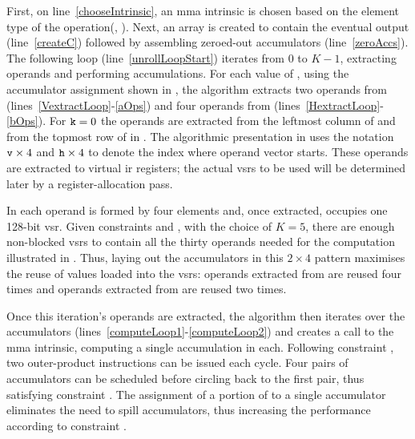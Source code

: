 \documentclass[\main/thesis.tex]{subfiles}
\begin{document}
First, on line~\ref{chooseIntrinsic}, an \gls{mma} intrinsic is chosen based on the element type of the operation\footnotemark (\eg {}, ).
Next, an array is created to contain the eventual output (line~\ref{createC}) followed by assembling zeroed-out accumulators (line~\ref{zeroAccs}).
The following loop (line~\ref{unrollLoopStart}) iterates from $0$ to $K-1$, extracting operands and performing accumulations.
For each value of , using the accumulator assignment shown in , the algorithm extracts two operands from  (lines~\ref{VextractLoop}-\ref{aOps}) and four operands from  (lines~\ref{HextractLoop}-\ref{bOps}).
For $\text{\code{k}}=0$ the operands are extracted from the leftmost column of  and from the topmost row of  in .
The algorithmic presentation in  uses the notation \code{ATile[}$\text{\code{v}} \times 4$\code{][k]} and \code{BTile[}$\text{\code{h}} \times 4$\code{][k]} to denote the index where operand vector starts.
These operands are extracted to virtual \gls{ir} registers; the actual \glspl{vsr} to be used will be determined later by a register-allocation pass.

In  each operand is formed by four elements and, once extracted, occupies one 128-bit \gls{vsr}.
Given constraints  and , with the choice of $K = 5$, there are enough non-blocked \glspl{vsr} to contain all the thirty operands needed for the computation illustrated in .
Thus, laying out the accumulators in this $2 \times 4$ pattern maximises the reuse of values loaded into the \glspl{vsr}: operands extracted from  are reused four times and operands extracted from  are reused two times.

Once this iteration's operands are extracted, the algorithm then iterates over the accumulators (lines~\ref{computeLoop1}-\ref{computeLoop2}) and creates a call to the \gls{mma} \gls{intrinsic}, computing a single accumulation in each.
Following constraint , two outer-product instructions can be issued each cycle.
Four pairs of accumulators can be scheduled before circling back to the first pair, thus satisfying constraint .
The assignment of a portion of  to a single accumulator eliminates the need to spill accumulators, thus increasing the performance according to constraint .
\end{document}
